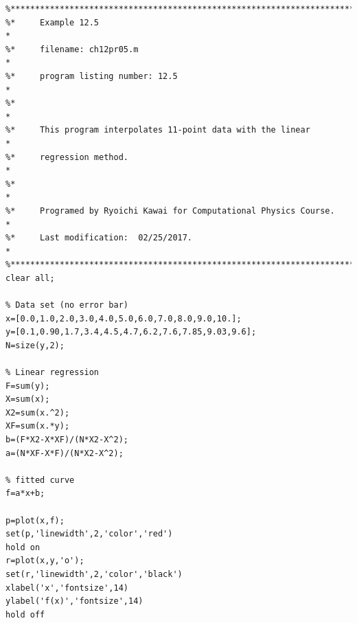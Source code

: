 \bigskip
\noindent
\program
\label{prog:linear_regression}
\footnotesize
\begin{verbatim}
%**************************************************************************
%*     Example 12.5                                                       *
%*     filename: ch12pr05.m                                               *
%*     program listing number: 12.5                                       *
%*                                                                        *
%*     This program interpolates 11-point data with the linear            *
%*     regression method.                                                 *
%*                                                                        *
%*     Programed by Ryoichi Kawai for Computational Physics Course.       *
%*     Last modification:  02/25/2017.                                    *
%**************************************************************************
clear all;

% Data set (no error bar)
x=[0.0,1.0,2.0,3.0,4.0,5.0,6.0,7.0,8.0,9.0,10.];
y=[0.1,0.90,1.7,3.4,4.5,4.7,6.2,7.6,7.85,9.03,9.6];
N=size(y,2);

% Linear regression
F=sum(y);
X=sum(x);
X2=sum(x.^2);
XF=sum(x.*y);
b=(F*X2-X*XF)/(N*X2-X^2);
a=(N*XF-X*F)/(N*X2-X^2);

% fitted curve
f=a*x+b;

p=plot(x,f);
set(p,'linewidth',2,'color','red')
hold on
r=plot(x,y,'o');
set(r,'linewidth',2,'color','black')
xlabel('x','fontsize',14)
ylabel('f(x)','fontsize',14)
hold off
\end{verbatim}
\normalsize

